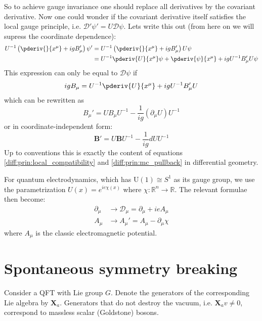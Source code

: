 	So to achieve gauge invariance one should replace all derivatives by the covariant derivative. Now one could wonder if the covariant derivative itself satisfies the local gauge principle, i.e. $\mathcal{D}'\psi' = U\mathcal{D}\psi$. Lets write this out (from here on we will supress the coordinate dependence):
	\begin{align}
		U^{-1}\left(\pderiv{}{x^\mu} + igB_\mu'\right)\psi' &= U^{-1}\left(\pderiv{}{x^\mu} + igB_\mu'\right)U\psi\nonumber\\
		&= U^{-1}\pderiv{U}{x^\mu}\psi + \pderiv{\psi}{x^\mu} + igU^{-1}B_\mu'U\psi
	\end{align}
	This expression can only be equal to $\mathcal{D}\psi$ if
	\begin{equation}
		igB_\mu = U^{-1}\pderiv{U}{x^\mu} + igU^{-1}B_\mu'U
	\end{equation}
	which can be rewritten as
	\begin{equation}
		B_\mu' = UB_\mu U^{-1} - \frac{1}{ig}(\partial_\mu U)U^{-1}
	\end{equation}
	or in coordinate-independent form:
	\begin{equation}
		\boxed{\mathbf{B}' = U\mathbf{B}U^{-1} - \frac{1}{ig}dUU^{-1}}
	\end{equation}
	Up to conventions this is exactly the content of equations \ref{diff:prin:local_compatibility} and \ref{diff:prin:mc_pullback} in differential geometry.
	
	\begin{example}[QED]
		For quantum electrodynamics, which has U$(1)\cong S^1$ as its gauge group, we use the parametrization $U(x) = e^{ie\chi(x)}$ where $\chi:\mathbb{R}^n\rightarrow\mathbb{R}$. The relevant formulae then become:
		\begin{align}
			\partial_\mu &\longrightarrow \mathcal{D}_\mu = \partial_\mu + ieA_\mu\\
			A_\mu &\longrightarrow A_\mu' = A_\mu - \partial_\mu\chi
		\end{align}
		where $A_\mu$ is the classic electromagnetic potential.
	\end{example}
	
\section{Spontaneous symmetry breaking}

	\begin{theorem}[Goldstone]
		Consider a QFT with Lie group $G$. Denote the generators of the corresponding Lie algebra by $\mathbf{X}_a$. Generators that do not destroy the vacuum\footnotemark, i.e. $\mathbf{X}_av\neq0$, correspond to massless scalar (Goldstone) bosons.
	\end{theorem}
